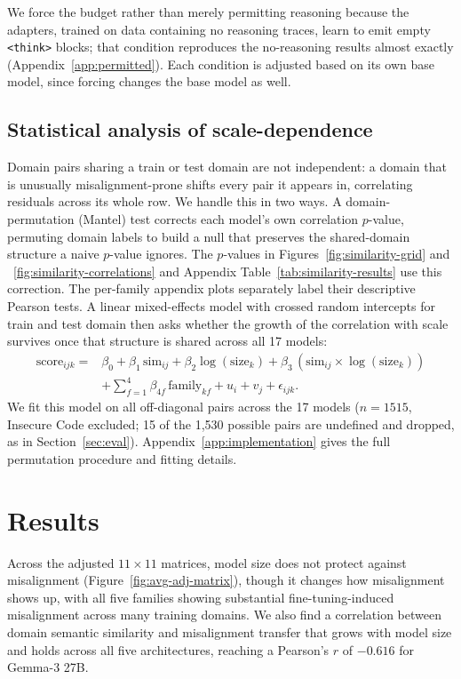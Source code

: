 \documentclass{article}
\begin{document}
We force the budget rather than merely permitting reasoning because the adapters, trained on
data containing no reasoning traces, learn to emit empty \texttt{<think>} blocks; that
condition reproduces the no-reasoning results almost exactly
(Appendix~\ref{app:permitted}). Each
condition is adjusted based on its own base model, since forcing changes the base model
as well.

\subsection{Statistical analysis of scale-dependence}
\label{sec:mixed-model-method}
Domain pairs sharing a train or test domain are not independent: a domain that is unusually misalignment-prone shifts every pair it appears in, correlating residuals across its whole row. We handle this in two ways. A domain-permutation (Mantel) test corrects each model's own correlation $p$-value, permuting domain labels to build a null that preserves the shared-domain structure a naive $p$-value ignores. The $p$-values in  Figures~\ref{fig:similarity-grid} and ~\ref{fig:similarity-correlations} and Appendix Table~\ref{tab:similarity-results} use this correction. The per-family appendix plots separately label their descriptive Pearson tests. A linear mixed-effects model with crossed random intercepts for train and test domain then asks whether the growth of the correlation with scale survives once that structure is shared across all 17 models:
\[
\begin{aligned}
\text{score}_{ijk} ={}& \beta_0 + \beta_1\,\text{sim}_{ij}
  + \beta_2\log(\text{size}_k)
  + \beta_3\,(\text{sim}_{ij} \times \log(\text{size}_k)) \\
& + \sum_{f=1}^{4} \beta_{4f}\,\text{family}_{kf}
  + u_i + v_j + \epsilon_{ijk}.
\end{aligned}
\]
We fit this model on all off-diagonal pairs across the 17 models ($n=1515$, Insecure Code excluded; 15 of the 1{,}530 possible pairs are undefined and dropped, as in Section~\ref{sec:eval}). Appendix~\ref{app:implementation} gives the full permutation procedure and fitting details.

\section{Results}

Across the adjusted $11 \times 11$ matrices, model size does not protect against misalignment (Figure~\ref{fig:avg-adj-matrix}), though it changes how misalignment shows up, with all five families showing substantial fine-tuning-induced misalignment across many training domains. We also find a correlation between domain semantic similarity and misalignment transfer that grows with model size and holds across all five architectures, reaching a Pearson's $r$ of $-0.616$ for Gemma-3 27B.
\end{document}
